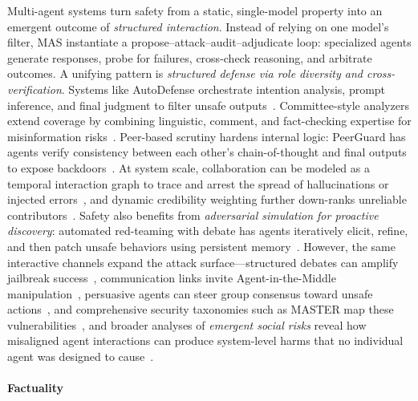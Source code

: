 Multi-agent systems turn safety from a static, single-model property into an emergent outcome of \emph{structured interaction}. Instead of relying on one model's filter, MAS instantiate a propose--attack--audit--adjudicate loop: specialized agents generate responses, probe for failures, cross-check reasoning, and arbitrate outcomes. A unifying pattern is \emph{structured defense via role diversity and cross-verification}. Systems like AutoDefense orchestrate intention analysis, prompt inference, and final judgment to filter unsafe outputs~\citep{zeng2024autodefense}. Committee-style analyzers extend coverage by combining linguistic, comment, and fact-checking expertise for misinformation risks~\citep{li2025multiagentframeworkautomateddecision}. Peer-based scrutiny hardens internal logic: PeerGuard has agents verify consistency between each other's chain-of-thought and final outputs to expose backdoors~\citep{fan2025peerguarddefendingmultiagentsystems}. At system scale, collaboration can be modeled as a temporal interaction graph to trace and arrest the spread of hallucinations or injected errors~\citep{zhou2025guardiansafeguardingllmmultiagent}, and dynamic credibility weighting further down-ranks unreliable contributors~\citep{ebrahimi2025adversaryresistantmultiagentllmcredibility}. Safety also benefits from \emph{adversarial simulation for proactive discovery}: automated red-teaming with debate has agents iteratively elicit, refine, and then patch unsafe behaviors using persistent memory~\citep{asad2025reddebatesaferresponsesmultiagent}. However, the same interactive channels expand the attack surface---structured debates can amplify jailbreak success~\citep{qi2025amplifiedvulnerabilitiesstructuredjailbreak}, communication links invite Agent-in-the-Middle manipulation~\citep{he-etal-2025-red}, persuasive agents can steer group consensus toward unsafe actions~\citep{zhang-etal-2024-psysafe}, and comprehensive security taxonomies such as MASTER map these vulnerabilities~\citep{zhu2025mastermultiagentsecurityexploration}, and broader analyses of \emph{emergent social risks} reveal how misaligned agent interactions can produce system-level harms that no individual agent was designed to cause~\citep{huang2026emergent}.

\paragraph{Factuality}

